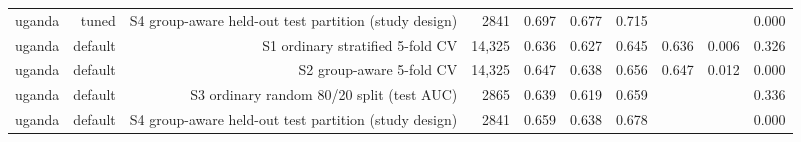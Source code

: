 \documentclass[10pt]{article}
\begin{document}
\begin{longtable}{rrrrrrrrrr}
uganda & tuned & S4 group-aware held-out test partition (study design) & 2841 & 0.697 & 0.677 & 0.715 &  &  & 0.000 \\
uganda & default & S1 ordinary stratified 5-fold CV & 14{,}325 & 0.636 & 0.627 & 0.645 & 0.636 & 0.006 & 0.326 \\
uganda & default & S2 group-aware 5-fold CV & 14{,}325 & 0.647 & 0.638 & 0.656 & 0.647 & 0.012 & 0.000 \\
uganda & default & S3 ordinary random 80/20 split (test AUC) & 2865 & 0.639 & 0.619 & 0.659 &  &  & 0.336 \\
uganda & default & S4 group-aware held-out test partition (study design) & 2841 & 0.659 & 0.638 & 0.678 &  &  & 0.000 \\
\bottomrule
\end{longtable}
\normalsize
\end{document}
